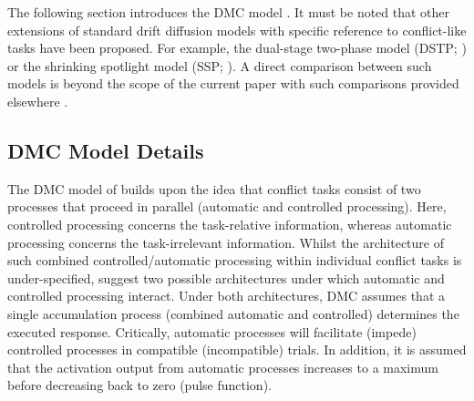 The following section introduces the DMC model \textcite{ulrich2015automatic}.
It must be noted that other extensions of standard drift diffusion models with
specific reference to conflict-like tasks have been proposed. For example, the
dual-stage two-phase model (DSTP; \textcite{hubner2010dual}) or the shrinking
spotlight model (SSP; \textcite{white2011diffusion}). A direct comparison
between such models is beyond the scope of the current paper with such
comparisons provided elsewhere \parencite[see][albeit with specific reference
to the flanker task only]{white2018testing, evans2020comparison}.

\subsection{DMC Model Details} 
\label{model_details} 

The DMC model of \textcite{ulrich2015automatic} builds upon the idea that
conflict tasks consist of two processes that proceed in parallel (automatic and
controlled processing). Here, controlled processing concerns the task-relative
information, whereas automatic processing concerns the task-irrelevant
information. Whilst the architecture of such combined controlled/automatic
processing within individual conflict tasks is under-specified,
\textcite{ulrich2015automatic} suggest two possible architectures
\parencite[see Figure 1][]{ulrich2015automatic} under which automatic and
controlled processing interact. Under both architectures, DMC assumes that a
single accumulation process (combined automatic and controlled) determines the
executed response. Critically, automatic processes will facilitate (impede)
controlled processes in compatible (incompatible) trials. In addition, it is
assumed that the activation output from automatic processes increases to a
maximum before decreasing back to zero (pulse function).


